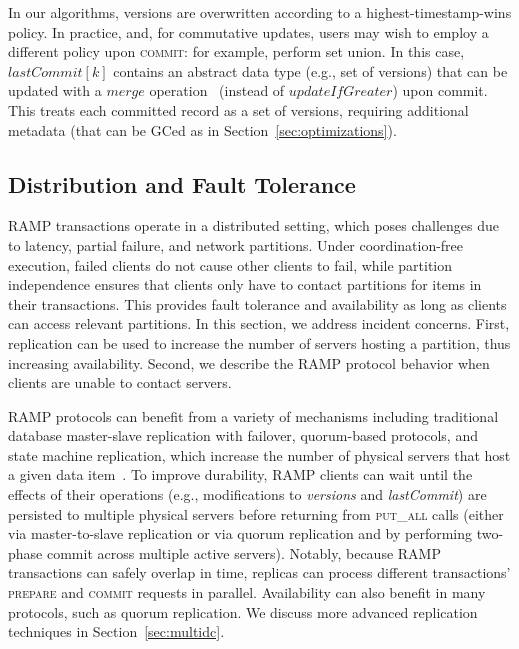  In our algorithms, versions are overwritten
according to a highest-timestamp-wins policy. In practice, and, for
commutative updates, users may wish to employ a different policy upon
\textsc{commit}: for example, perform set union. In this case,
$lastCommit[k]$ contains an abstract data type (e.g., set of versions)
that can be updated with a $merge$
operation~\cite{dynamo,sessionguarantees} (instead of
$updateIfGreater$) upon commit. This treats each committed record as a
set of versions, requiring additional metadata (that can be GCed as in
Section~\ref{sec:optimizations}).


\subsection{Distribution and Fault Tolerance}
\label{sec:replication}

RAMP transactions operate in a distributed setting, which poses
challenges due to latency, partial failure, and network
partitions. Under coordination-free execution, failed clients do not
cause other clients to fail, while partition independence ensures that
clients only have to contact partitions for items in their
transactions. This provides fault tolerance and availability as long
as clients can access relevant partitions. In this section, we address
incident concerns. First, replication can be used to increase the
number of servers hosting a partition, thus increasing
availability. Second, we describe the RAMP protocol behavior when
clients are unable to contact servers.

 RAMP protocols can benefit from a variety of
mechanisms including traditional database master-slave replication
with failover, quorum-based protocols, and state machine replication,
which increase the number of physical servers that host a given data
item~\cite{bernstein-book}. To improve durability, RAMP clients can
wait until the effects of their operations (e.g., modifications to
\textit{versions} and \textit{lastCommit}) are persisted to multiple
physical servers before returning from \textsc{put\_all} calls (either
via master-to-slave replication or via quorum replication and by
performing two-phase commit across multiple active servers). Notably,
because RAMP transactions can safely overlap in time, replicas can
process different transactions' \textsc{prepare} and \textsc{commit}
requests in parallel. Availability can also benefit in many protocols,
such as quorum replication. We discuss more advanced replication
techniques in Section~\ref{sec:multidc}.

